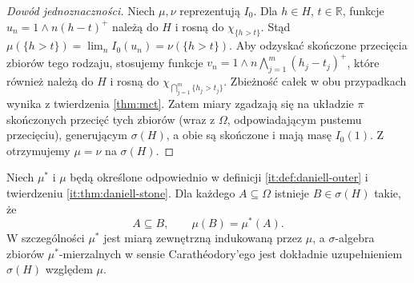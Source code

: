 \begin{proof}[Dowód jednoznaczności]
Niech $\mu,\nu$ reprezentują $I_0$. Dla $h\in H$, $t\in\mathbb{R}$, funkcje $u_n=1\wedge n(h-t)^+$ należą do $H$ i rosną do $\chi_{\{h>t\}}$. Stąd $\mu(\{h>t\})=\lim_nI_0(u_n)=\nu(\{h>t\})$. Aby odzyskać skończone przecięcia zbiorów tego rodzaju, stosujemy funkcje $v_n=1\wedge n\bigwedge_{j=1}^m(h_j-t_j)^+$, które również należą do $H$ i rosną do $\chi_{\bigcap_{j=1}^m\{h_j>t_j\}}$. Zbieżność całek w obu przypadkach wynika z twierdzenia \ref{thm:mct}. Zatem miary zgadzają się na układzie $\pi$ skończonych przecięć tych zbiorów (wraz z $\Omega$, odpowiadającym pustemu przecięciu), generującym $\sigma(H)$, a obie są skończone i mają masę $I_0(1)$. Z 
otrzymujemy $\mu=\nu$ na $\sigma(H)$.
\end{proof}
\begin{wniosek}
\label{it:cor:daniell-completion}
Niech $\mu^*$ i $\mu$ będą określone odpowiednio
w definicji \ref{it:def:daniell-outer} i twierdzeniu
\ref{it:thm:daniell-stone}. Dla każdego $A\subseteq\Omega$
istnieje $B\in\sigma(H)$ takie, że
\[
 A\subseteq B,\qquad \mu(B)=\mu^*(A).
\]
W szczególności $\mu^*$ jest miarą zewnętrzną indukowaną
przez $\mu$, a $\sigma$-algebra zbiorów
$\mu^*$-mierzalnych w sensie Carathéodory'ego
jest dokładnie uzupełnieniem $\sigma(H)$ względem $\mu$.
\end{wniosek}
